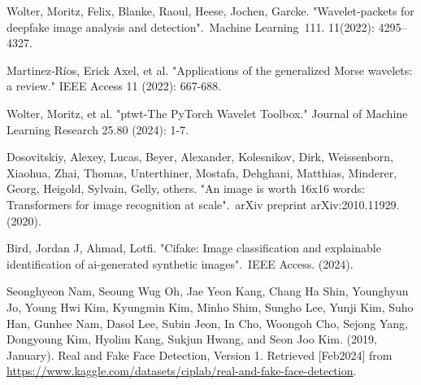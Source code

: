 \documentclass{svproc}
\begin{document}
\begin{thebibliography}{6}
  Wolter, Moritz, Felix, Blanke, Raoul, Heese, Jochen, Garcke. "Wavelet-packets for deepfake image analysis and detection". Machine Learning 111. 11(2022): 4295–4327.

  Martinez-Ríos, Erick Axel, et al. "Applications of the generalized Morse wavelets: a review." IEEE Access 11 (2022): 667-688.

  Wolter, Moritz, et al. "ptwt-The PyTorch Wavelet Toolbox." Journal of Machine Learning Research 25.80 (2024): 1-7.

  Dosovitskiy, Alexey, Lucas, Beyer, Alexander, Kolesnikov, Dirk, Weissenborn, Xiaohua, Zhai, Thomas, Unterthiner, Mostafa, Dehghani, Matthias, Minderer, Georg, Heigold, Sylvain, Gelly, others. "An image is worth 16x16 words: Transformers for image recognition at scale". arXiv preprint arXiv:2010.11929. (2020).

  Bird, Jordan J, Ahmad, Lotfi. "Cifake: Image classification and explainable identification of ai-generated synthetic images". IEEE Access. (2024).

  Seonghyeon Nam, Seoung Wug Oh, Jae Yeon Kang, Chang Ha Shin, Younghyun Jo, Young Hwi Kim, Kyungmin Kim, Minho Shim, Sungho Lee, Yunji Kim, Suho Han, Gunhee Nam, Dasol Lee, Subin Jeon, In Cho, Woongoh Cho, Sejong Yang, Dongyoung Kim, Hyolim Kang, Sukjun Hwang, and Seon Joo Kim. (2019, January). Real and Fake Face Detection, Version 1. Retrieved [Feb2024] from \url{https://www.kaggle.com/datasets/ciplab/real-and-fake-face-detection}.







\end{thebibliography}
\end{document}
